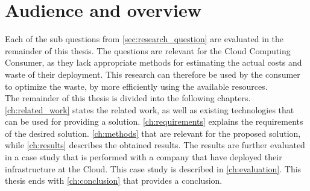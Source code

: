 \section{Audience and overview} \label{sec:audience}
Each of the sub questions from \autoref{sec:research_question} are evaluated in the remainder of this thesis. The questions are relevant for the Cloud Computing Consumer, as they lack appropriate methods for estimating the actual costs and waste of their deployment. This research can therefore be used by the consumer to optimize the waste, by  more efficiently using the available resources. \\

\noindent
The remainder of this thesis is divided into the following chapters. \autoref{ch:related_work} states the related work, as well as existing technologies that can be used for providing a solution. \autoref{ch:requirements} explains the requirements of the desired solution. \autoref{ch:methods} that are relevant for the proposed solution, while \autoref{ch:results} describes the obtained results. The results are further evaluated in a case study that is performed with a company that have deployed their infrastructure at the Cloud. This case study is described in \autoref{ch:evaluation}. This thesis ends with \autoref{ch:conclusion} that provides a conclusion.